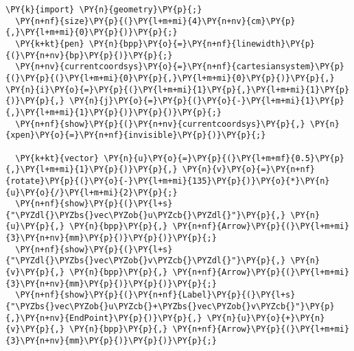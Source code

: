 \begin{Verbatim}[commandchars=\\\{\}]
  \PY{k}{import} \PY{n}{geometry}\PY{p}{;}
  \PY{n+nf}{size}\PY{p}{(}\PY{l+m+mi}{4}\PY{n+nv}{cm}\PY{p}{,}\PY{l+m+mi}{0}\PY{p}{)}\PY{p}{;}
  \PY{k+kt}{pen} \PY{n}{bpp}\PY{o}{=}\PY{n+nf}{linewidth}\PY{p}{(}\PY{n+nv}{bp}\PY{p}{)}\PY{p}{;}
  \PY{n+nv}{currentcoordsys}\PY{o}{=}\PY{n+nf}{cartesiansystem}\PY{p}{(}\PY{p}{(}\PY{l+m+mi}{0}\PY{p}{,}\PY{l+m+mi}{0}\PY{p}{)}\PY{p}{,} \PY{n}{i}\PY{o}{=}\PY{p}{(}\PY{l+m+mi}{1}\PY{p}{,}\PY{l+m+mi}{1}\PY{p}{)}\PY{p}{,} \PY{n}{j}\PY{o}{=}\PY{p}{(}\PY{o}{-}\PY{l+m+mi}{1}\PY{p}{,}\PY{l+m+mi}{1}\PY{p}{)}\PY{p}{)}\PY{p}{;}
  \PY{n+nf}{show}\PY{p}{(}\PY{n+nv}{currentcoordsys}\PY{p}{,} \PY{n}{xpen}\PY{o}{=}\PY{n+nf}{invisible}\PY{p}{)}\PY{p}{;}

  \PY{k+kt}{vector} \PY{n}{u}\PY{o}{=}\PY{p}{(}\PY{l+m+mf}{0.5}\PY{p}{,}\PY{l+m+mi}{1}\PY{p}{)}\PY{p}{,} \PY{n}{v}\PY{o}{=}\PY{n+nf}{rotate}\PY{p}{(}\PY{o}{-}\PY{l+m+mi}{135}\PY{p}{)}\PY{o}{*}\PY{n}{u}\PY{o}{/}\PY{l+m+mi}{2}\PY{p}{;}
  \PY{n+nf}{show}\PY{p}{(}\PY{l+s}{"\PYZdl{}\PYZbs{}vec\PYZob{}u\PYZcb{}\PYZdl{}"}\PY{p}{,} \PY{n}{u}\PY{p}{,} \PY{n}{bpp}\PY{p}{,} \PY{n+nf}{Arrow}\PY{p}{(}\PY{l+m+mi}{3}\PY{n+nv}{mm}\PY{p}{)}\PY{p}{)}\PY{p}{;}
  \PY{n+nf}{show}\PY{p}{(}\PY{l+s}{"\PYZdl{}\PYZbs{}vec\PYZob{}v\PYZcb{}\PYZdl{}"}\PY{p}{,} \PY{n}{v}\PY{p}{,} \PY{n}{bpp}\PY{p}{,} \PY{n+nf}{Arrow}\PY{p}{(}\PY{l+m+mi}{3}\PY{n+nv}{mm}\PY{p}{)}\PY{p}{)}\PY{p}{;}
  \PY{n+nf}{show}\PY{p}{(}\PY{n+nf}{Label}\PY{p}{(}\PY{l+s}{"\PYZbs{}vec\PYZob{}u\PYZcb{}+\PYZbs{}vec\PYZob{}v\PYZcb{}"}\PY{p}{,}\PY{n+nv}{EndPoint}\PY{p}{)}\PY{p}{,} \PY{n}{u}\PY{o}{+}\PY{n}{v}\PY{p}{,} \PY{n}{bpp}\PY{p}{,} \PY{n+nf}{Arrow}\PY{p}{(}\PY{l+m+mi}{3}\PY{n+nv}{mm}\PY{p}{)}\PY{p}{)}\PY{p}{;}
\end{Verbatim}
